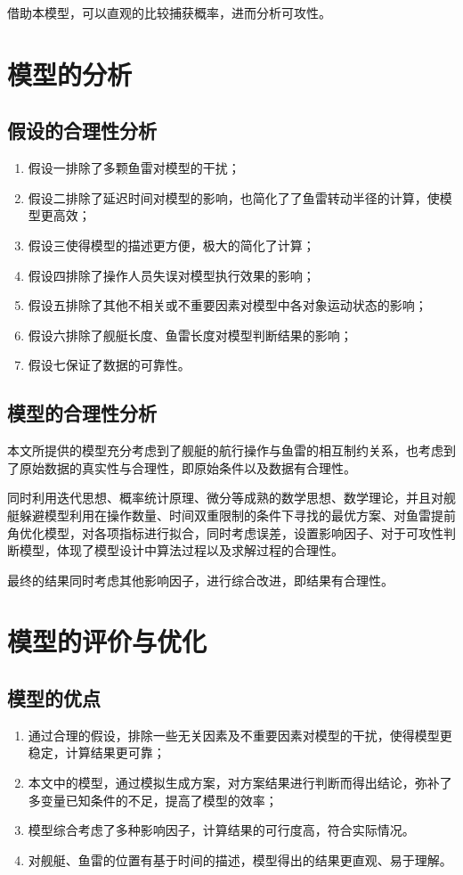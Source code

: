 \documentclass[12pt]{article}%
\begin{document}
借助本模型，可以直观的比较捕获概率，进而分析可攻性。
\section{模型的分析}

\subsection{假设的合理性分析}
\begin{enumerate}[1.]\addtolength{\itemsep}{-1.5ex}
\item 假设一排除了多颗鱼雷对模型的干扰；
\item 假设二排除了延迟时间对模型的影响，也简化了了鱼雷转动半径的计算，使模型更高效；
\item 假设三使得模型的描述更方便，极大的简化了计算；
\item 假设四排除了操作人员失误对模型执行效果的影响；
\item 假设五排除了其他不相关或不重要因素对模型中各对象运动状态的影响；
\item 假设六排除了舰艇长度、鱼雷长度对模型判断结果的影响；
\item 假设七保证了数据的可靠性。
\end{enumerate}
\subsection{模型的合理性分析}
本文所提供的模型充分考虑到了舰艇的航行操作与鱼雷的相互制约关系，也考虑到了原始数据的真实性与合理性，即原始条件以及数据有合理性。

同时利用迭代思想、概率统计原理、微分等成熟的数学思想、数学理论，并且对舰艇躲避模型利用在操作数量、时间双重限制的条件下寻找的最优方案、对鱼雷提前角优化模型，对各项指标进行拟合，同时考虑误差，设置影响因子、对于可攻性判断模型，体现了模型设计中算法过程以及求解过程的合理性。

最终的结果同时考虑其他影响因子，进行综合改进，即结果有合理性。
\section{模型的评价与优化}
\subsection{模型的优点}
\begin{enumerate}[1.]\addtolength{\itemsep}{-1.5ex}
\item 通过合理的假设，排除一些无关因素及不重要因素对模型的干扰，使得模型更稳定，计算结果更可靠；
\item 本文中的模型，通过模拟生成方案，对方案结果进行判断而得出结论，弥补了多变量已知条件的不足，提高了模型的效率；
\item 模型综合考虑了多种影响因子，计算结果的可行度高，符合实际情况。
\item 对舰艇、鱼雷的位置有基于时间的描述，模型得出的结果更直观、易于理解。
\end{enumerate}
\end{document}
